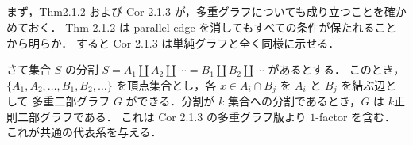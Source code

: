 \subsection{}
まず，Thm2.1.2 および Cor 2.1.3 が，多重グラフについても成り立つことを確かめておく．
Thm 2.1.2 は parallel edge を消してもすべての条件が保たれることから明らか．
すると Cor 2.1.3 は単純グラフと全く同様に示せる．

さて集合 $S$ の分割 $S = A_1\amalg A_2\amalg \cdots = B_1\amalg B_2\amalg \cdots$ があるとする．
このとき，$\{A_1,A_2,\ldots,B_1,B_2,\ldots\}$ を頂点集合とし，各 $x \in A_i\cap B_j$ を $A_i$ と $B_j$ を結ぶ辺として
多重二部グラフ $G$ ができる．分割が $k$ 集合への分割であるとき，$G$ は $k$正則二部グラフである．
これは Cor 2.1.3 の多重グラフ版より $1$-factor を含む．これが共通の代表系を与える．
